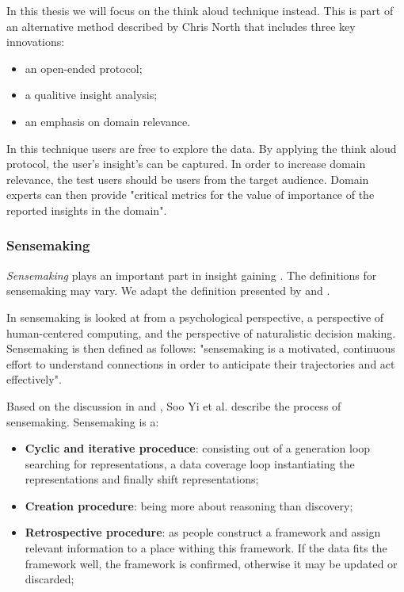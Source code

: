 In this thesis we will focus on the think aloud technique instead. This is part of an alternative method described by Chris North that includes three key innovations\cite{north:2006}:

\begin{itemize}
	\item an open-ended protocol;
	\item a qualitive insight analysis;
	\item an emphasis on domain relevance.
\end{itemize}

In this technique users are free to explore the data. By applying the think aloud protocol, the user's insight's can be captured. In order to increase domain relevance, the test users should be users from the target audience. Domain experts can then provide "critical metrics for the value of importance of the reported insights in the domain"\cite{north:2006}.


\subsubsection{Sensemaking}\label{chapter:literature_study:section:user:subsection:insight:subsubsection:sensemaking}

\emph{Sensemaking} plays an important part in insight gaining \cite{yi:2008}. The definitions for sensemaking may vary. We adapt the definition presented by \cite{Klein:2006:MSS:1158821.1159015} and \cite{yi:2008}.

In \cite{Klein:2006:MSS:1158821.1159015} sensemaking is looked at from a psychological perspective, a perspective of human-centered computing, and the perspective of naturalistic decision making. Sensemaking is then defined as follows: "sensemaking is a motivated, continuous effort to understand connections in order to anticipate their trajectories and act effectively"\cite{Klein:2006:MSS:1158821.1159015}.

Based on the discussion in \cite{klein:2006:MSS:1175882.1176017} and \cite{yi:2008}, Soo Yi et al. describe the process of sensemaking. Sensemaking is a:

\begin{itemize}
	\item \textbf{Cyclic and iterative proceduce}: consisting out of a generation loop searching for representations, a data coverage loop instantiating the representations and finally shift representations;
	\item \textbf{Creation procedure}: being more about reasoning than discovery;
	\item \textbf{Retrospective procedure}: as people construct a framework and assign relevant information to a place withing this framework. If the data fits the framework well, the framework is confirmed, otherwise it may be updated or discarded;
\end{itemize}

